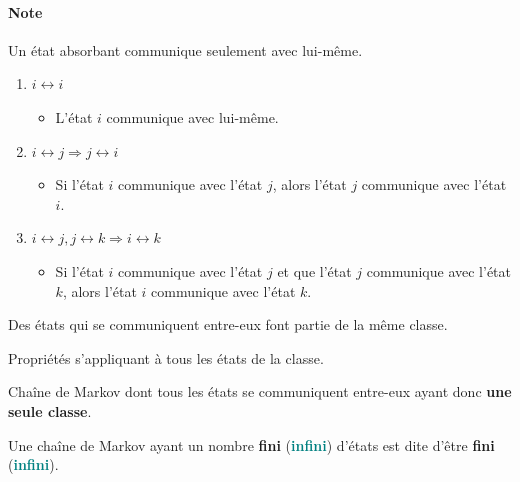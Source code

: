 \documentclass[french]{article}
\begin{document}
\begin{multicols*}{2}
\paragraph{Note}	Un état absorbant communique seulement avec lui-même.
 
\begin{definitionNOHFILLpropos}
\begin{enumerate}[label	=	\circled{\arabic*}{trueblue}]
	\item	$i \leftrightarrow i$
		\begin{itemize}
		\item	L'état $i$ communique avec lui-même.
		\end{itemize}
	\item	$i \leftrightarrow j \Rightarrow j \leftrightarrow i$
		\begin{itemize}
		\item	Si l'état $i$ communique avec l'état $j$, alors l'état $j$ communique avec l'état $i$.
		\end{itemize}
	\item	$i \leftrightarrow j, j \leftrightarrow k \Rightarrow i \leftrightarrow k$
		\begin{itemize}
		\item	Si l'état $i$ communique avec l'état $j$ et que l'état $j$ communique avec l'état $k$, alors l'état $i$ communique avec l'état $k$.
		\end{itemize}
\end{enumerate}
\end{definitionNOHFILLpropos}


\begin{definitionNOHFILL}
Des états qui se communiquent entre-eux font partie de la même classe.

\begin{definitionNOHFILLsub}
Propriétés s'appliquant à tous les états de la classe.
\end{definitionNOHFILLsub}
\end{definitionNOHFILL}


\begin{definitionNOHFILL}
Chaîne de Markov dont tous les états se communiquent entre-eux ayant donc \textbf{une seule classe}.
\end{definitionNOHFILL}

\begin{definitionNOHFILLprop}
Une chaîne de Markov ayant un nombre \textbf{fini} (\textcolor{teal}{\textbf{infini}}) d'états est dite d'être \textbf{fini} (\textcolor{teal}{\textbf{infini}}).
\end{definitionNOHFILLprop}



\end{multicols*}
\end{document}
